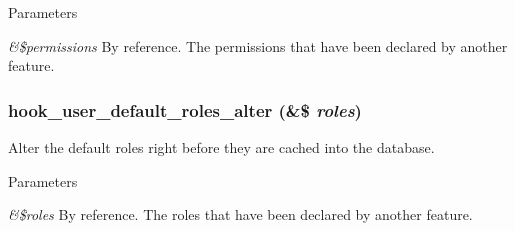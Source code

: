 \begin{DoxyParams}{Parameters}
\item[{\em \&\$permissions}]By reference. The permissions that have been declared by another feature. \end{DoxyParams}
\hypertarget{group__features__component__alter__hooks_gaad88a5479c355cebaa80b017f0a83a4d}{
\subsubsection[{hook\_\-user\_\-default\_\-roles\_\-alter}]{\setlength{\rightskip}{0pt plus 5cm}hook\_\-user\_\-default\_\-roles\_\-alter (\&\$ {\em roles})}}
\label{group__features__component__alter__hooks_gaad88a5479c355cebaa80b017f0a83a4d}
Alter the default roles right before they are cached into the database.


\begin{DoxyParams}{Parameters}
\item[{\em \&\$roles}]By reference. The roles that have been declared by another feature. \end{DoxyParams}
